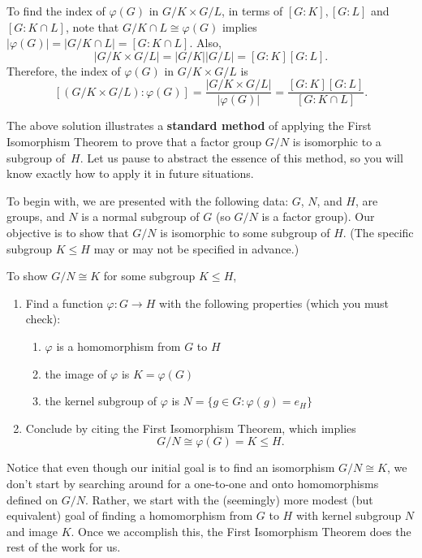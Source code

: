 \documentclass[12pt,reqno]{amsart}
\newcommand{\<}{\ensuremath{\langle}}
\renewcommand{\>}{\ensuremath{\rangle}}
\begin{document}
\begin{enumerate}
        To find the index of $\varphi(G)$ in $G/K \times G/L$, in terms of $[G:K], [G:L]$ and
        $[G:K\cap L]$, note that 
        $G/K\cap L \cong \varphi(G)$ implies 
        $|\varphi(G)| = |G/K\cap L| = [G: K \cap L]$.
        Also, 
        \[
        |G/K \times G/L| = |G/K| |G/L| = [G:K][G:L].
        \] 
        Therefore, the index of $\varphi(G)$ in $G/K \times G/L$ is
        \[
          [(G/K \times G/L):\varphi(G)] 
          = \frac{|G/K \times G/L|}{|\varphi(G)|}
          = \frac{[G:K][G:L]}{[G: K \cap L]}.
        \]

\bigskip
{} The above solution illustrates a {\bf standard method}
of applying the First Isomorphism Theorem to prove that a factor group $G/N$ is
isomorphic to a subgroup of~$H$.  Let us pause to abstract the essence
of this method, so you will know exactly how to apply it in future
situations.  

To begin with, we are presented with the following data: $G$, $N$, and $H$, are
groups, and $N$ is a normal subgroup of $G$ (so $G/N$ is a factor group). Our
objective is to show that $G/N$ is isomorphic to some subgroup of $H$.  (The
specific subgroup $K\leq H$ may or may not be specified in advance.)

 To show $G/N \cong K$ for some subgroup $K \leq H$, 
\begin{enumerate}
\item Find a function $\varphi: G \rightarrow H$ with the following properties
  (which you must check):
  \begin{enumerate}
  \item $\varphi$ is a homomorphism from $G$ to $H$
  \item the image of $\varphi$ is $K = \varphi(G)$
  \item the kernel subgroup of $\varphi$ is $N = \{g\in G: \varphi(g) = e_H\}$
  \end{enumerate}
\item Conclude by citing the First Isomorphism Theorem, which implies
  \[
  G/N \cong \varphi(G) = K\leq H.
  \]
\end{enumerate}
Notice that even though our initial goal is to find an isomorphism $G/N \cong K$,
we don't start by searching around for a one-to-one and onto homomorphisms
defined on $G/N$.
Rather, we start with the (seemingly) more modest (but equivalent) goal of
finding a homomorphism from $G$ to $H$ with kernel subgroup $N$ and image
$K$. Once we accomplish this, the First Isomorphism Theorem does the rest of the
work for us.


\end{enumerate}
\end{document}
